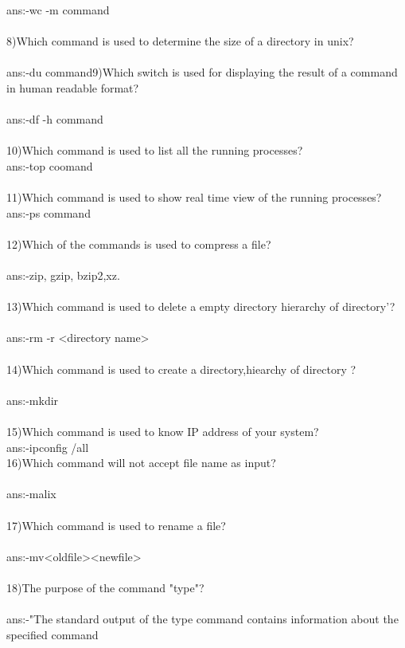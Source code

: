 \documentclass{article}
\begin{document}
{ans:-wc -m command\\ \\
8)Which command is used to determine the size of a directory in unix?\\ \\
ans:-du command9)Which switch is used for displaying the result of a command in human readable format?\\ \\
ans:-df -h command\\ \\
10)Which command is used to list all the running processes?\\
ans:-top coomand\\ \\
11)Which command is used to show real time view of the running processes?\\
ans:-ps command\\ \\
12)Which of the commands is used to compress a file?\\ \\
ans:-zip, gzip, bzip2,xz.\\ \\
13)Which command is used to delete a empty directory hierarchy of directory'?\\ \\
ans:-rm -r <directory name>\\ \\
14)Which command is used to create a directory,hiearchy of directory ?\\ \\
ans:-mkdir\\ \\
15)Which command is used to know IP address of your system?\\
ans:-ipconfig /all\\
16)Which command will not accept file name as input?\\ \\
ans:-malix\\ \\
17)Which command is used to rename a file?\\ \\
ans:-mv<oldfile><newfile>\\ \\
18)The purpose of the command "type"?\\ \\
ans:-"The standard output of the type command contains information about the specified command
}
\end{document}
